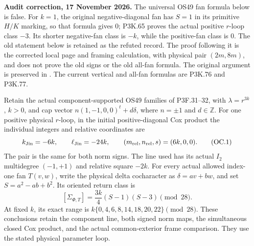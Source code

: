 \begin{theorem}\label{night:P3K.34}
\par\noindent\textbf{Audit correction, 17 November 2026.} The universal OS49 fan formula below is false. For \(k=1\), the original negative-diagonal fan has \(S=1\) in its primitive \(H/K\) marking, so that formula gives \(0\); P3K.65 proves the actual positive \(r\)-loop class \(-3\). Its shorter negative-fan class is \(-k\), while the positive-fan class is \(0\). The old statement below is retained as the refuted record. The proof following it is the corrected local page and framing calculation, with physical pair \((2m,8m)\), and does not prove the old signs or the old all-fan formula. The original argument is preserved in . The current vertical and all-fan formulas are P3K.76 and P3K.77.
\medskip


Retain the actual component-supported OS49 families of P3F.31--32,
with \(\lambda=r^{3k}\), \(k>0\), and cap vector
\(n(1,-1,0,0)^t+d\delta\), where \(n=\pm1\) and \(d\in\mathbb Z\).
For one positive physical \(r\)-loop, in the initial positive-diagonal
Cox product the individual integers and relative coordinates are
\[
 k_{\rm Jin}=-6k,\qquad \ell_{\rm Jin}=-24k,\qquad
 (m_{\rm rel},n_{\rm rel},s)=(6k,0,0).
 \tag{OC.1}
\]
The pair is the same for both norm signs. The line used has its actual
\(I_2\) multidegree \((-1,+1)\) and relative square \(-2k\).
For every actual allowed index-one fan \(T(v,w)\), write the physical
delta cocharacter as \(\delta=a v+b w\), and set \(S=a^2-ab+b^2\).
Its oriented return class is
\[
 [\Sigma_{\Phi,T}]=\frac{3k}{4}(S-1)(S-3)\pmod{28}.
 \tag{OC.2}
\]
At fixed \(k\), its exact range is
\(k\{0,4,6,8,14,18,20,22\}\pmod{28}\).
These conclusions retain the component line, both signed norm maps,
the simultaneous closed Cox product, and the actual common-exterior
frame comparison. They use the stated physical parameter loop.

\end{theorem}
